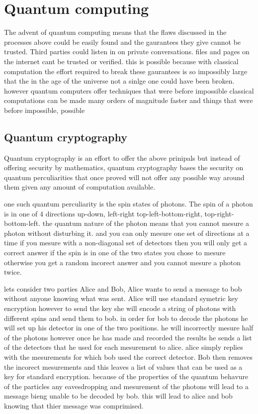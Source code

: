 \documentclass[12pt]{article}
\begin{document}
\section{Quantum computing}
The advent of quantum computing means that the flaws discussed in the
processes above could be easily found and the gaurantees they give cannot
be trusted. Third parties could listen in on private conversations. 
files and pages on the internet cant be trusted or verified. this is possible
because with classical computation the effort required to break these gaurantees
is so impossibly large that the in the age of the universe not a sinlge one
could have been broken. however quantum computers offer techniques that
were before impossible classical computations can be made many orders 
of magnitude faster and things that were before impossible, possible

\subsection{Quantum cryptography}
Quantum cryptography is an effort to offer the above prinipals but instead
of offering security by mathematics, quantum cryptography bases the security
on quantum perculiarities that once proved will not offer any possible way
around them given any amount of computation available.

one such quantum perculiarity is the spin states of photons. The spin of
a photon is in one of 4 directions up-down, left-right top-left-bottom-right, 
top-right-bottom-left. the quantum nature of the photon means that you cannot mesure a photon
without disturbing it. and you can only mesure one set of directions at a time
if you mesure with a non-diagonal set of detectors then you will only get 
a correct answer if the spin is in one of the two states you chose to mesure
otherwise you get a random incorect answer and you cannot mesure a photon
twice.

lets consider two parties Alice and Bob, Alice wants to send a message to
bob without anyone knowing what was sent.
Alice will use standard symetric key encryption however to send the key
she will encode a string of photons with different spins and send them to
bob. in order for bob to decode the photons he will set up his detector 
in one of the two positions. he will incorrectly mesure half of the photons
however once he has made and recorded the results he sends a list of the
detectors that he used for each mesurement to alice. alice simply replies
with the mesurements for which bob used the correct detector. Bob then 
removes the incorect mesurements and this leaves a list of values that 
can be used as a key for standard encryption. because of the properties
of the quantum behavure of the particles any eavesdropping and mesurement
of the photons will lead to a message bieng unable to be decoded by bob.
this will lead to alice and bob knowing that thier message was comprimised.
\end{document}
